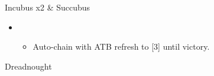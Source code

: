 \begin{paracol}{2}
\begin{battle}{Incubus x2 \& Succubus}
\begin{itemize}
\begin{itemize}
\begin{itemize}
					            \item Faith Vanille
					            \item Libra after the Succubus dies
				            \end{itemize}
				      \item Shift after Lightning's third attack
			      \end{itemize}
			\item \first
			      \begin{itemize}
				      \item Auto-chain with ATB refresh to [3] until victory.
			      \end{itemize}
		\end{itemize}
		 
	\end{battle}

	\switchcolumn*
	\begin{battle}{Dreadnought}


\end{battle}
\end{paracol}

